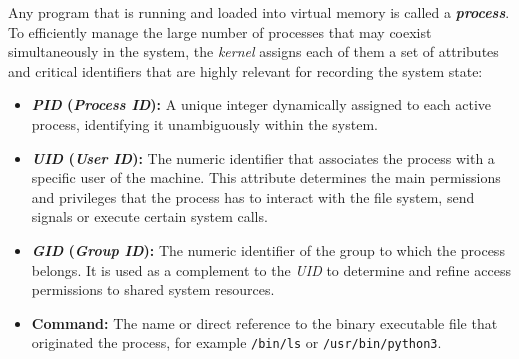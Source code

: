 Any program that is running and loaded into virtual memory is called a \textbf{\textit{process}}.
To efficiently manage the large number of processes that may coexist simultaneously in the system, the \textit{kernel} assigns each of them a set of attributes and critical identifiers that are highly relevant for recording the system state:

\begin{itemize}
    \item \textbf{\textit{PID} (\textit{Process ID}):} A unique integer dynamically assigned to each active process, identifying it unambiguously within the system.
    \item \textbf{\textit{UID} (\textit{User ID}):} The numeric identifier that associates the process with a specific user of the machine. This attribute determines the main permissions and privileges that the process has to interact with the file system, send signals or execute certain system calls.
    \item \textbf{\textit{GID} (\textit{Group ID}):} The numeric identifier of the group to which the process belongs. It is used as a complement to the \textit{UID} to determine and refine access permissions to shared system resources.
    \item \textbf{Command:} The name or direct reference to the binary executable file that originated the process, for example \texttt{/bin/ls} or \texttt{/usr/bin/python3}.
\end{itemize}

